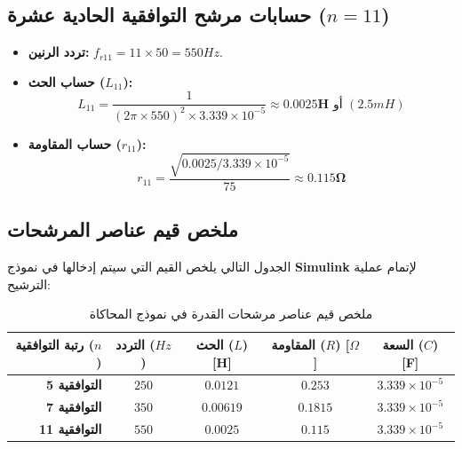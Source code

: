 \documentclass[12pt, a4paper, twoside]{article} %
\newcommand{\el}{\textenglish} %
\begin{document}
\subsection{حسابات مرشح التوافقية الحادية عشرة ($n=11$)}
\begin{itemize}
    \item \textbf{تردد الرنين:} $f_{r11} = 11 \times 50 = 550 Hz$.
    \item \textbf{حساب الحث ($L_{11}$):}
    \begin{equation*}
        L_{11} = \frac{1}{(2 \pi \times 550)^2 \times 3.339 \times 10^{-5}} \approx \mathbf{0.0025 H} \text{ أو } (2.5 mH)
    \end{equation*}
    \item \textbf{حساب المقاومة ($r_{11}$):}
    \begin{equation*}
        r_{11} = \frac{\sqrt{0.0025 / 3.339 \times 10^{-5}}}{75} \approx \mathbf{0.115 \Omega}
    \end{equation*}
\end{itemize}

\subsection{ملخص قيم عناصر المرشحات}
الجدول التالي يلخص القيم التي سيتم إدخالها في نموذج \el{\textbf{Simulink}} لإتمام عملية الترشيح:

\begin{table}[H]
\centering
\renewcommand{\arraystretch}{1.5} %
\begin{tabular}{|r||c|c|c|c|}
\hline
\textbf{رتبة التوافقية ($n$)} & \textbf{التردد ($Hz$)} & \textbf{الحث ($L$) \el{[H]}} & \textbf{المقاومة ($R$) \el{[$\Omega$]}} & \textbf{السعة ($C$) \el{[F]}} \\ \hline
\textbf{التوافقية 5} & $250$ & $0.0121$ & $0.253$ & $3.339 \times 10^{-5}$ \\ \hline
\textbf{التوافقية 7} & $350$ & $0.00619$ & $0.1815$ & $3.339 \times 10^{-5}$ \\ \hline
\textbf{التوافقية 11} & $550$ & $0.0025$ & $0.115$ & $3.339 \times 10^{-5}$ \\ \hline
\end{tabular}
\caption{ملخص قيم عناصر مرشحات القدرة في نموذج المحاكاة}
\label{tab:filters_summary}
\end{table}

\newpage

\end{document}

